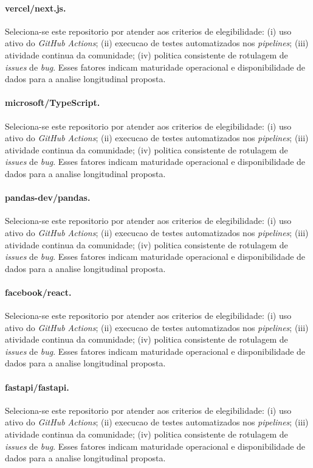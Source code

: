 \paragraph{vercel/next.js.} Seleciona-se este repositorio por atender aos criterios de elegibilidade: (i) uso ativo do \textit{GitHub Actions}; (ii) execucao de testes automatizados nos \textit{pipelines}; (iii) atividade continua da comunidade; (iv) politica consistente de rotulagem de \textit{issues} de \textit{bug}. Esses fatores indicam maturidade operacional e disponibilidade de dados para a analise longitudinal proposta.
\paragraph{microsoft/TypeScript.} Seleciona-se este repositorio por atender aos criterios de elegibilidade: (i) uso ativo do \textit{GitHub Actions}; (ii) execucao de testes automatizados nos \textit{pipelines}; (iii) atividade continua da comunidade; (iv) politica consistente de rotulagem de \textit{issues} de \textit{bug}. Esses fatores indicam maturidade operacional e disponibilidade de dados para a analise longitudinal proposta.
\paragraph{pandas-dev/pandas.} Seleciona-se este repositorio por atender aos criterios de elegibilidade: (i) uso ativo do \textit{GitHub Actions}; (ii) execucao de testes automatizados nos \textit{pipelines}; (iii) atividade continua da comunidade; (iv) politica consistente de rotulagem de \textit{issues} de \textit{bug}. Esses fatores indicam maturidade operacional e disponibilidade de dados para a analise longitudinal proposta.
\paragraph{facebook/react.} Seleciona-se este repositorio por atender aos criterios de elegibilidade: (i) uso ativo do \textit{GitHub Actions}; (ii) execucao de testes automatizados nos \textit{pipelines}; (iii) atividade continua da comunidade; (iv) politica consistente de rotulagem de \textit{issues} de \textit{bug}. Esses fatores indicam maturidade operacional e disponibilidade de dados para a analise longitudinal proposta.
\paragraph{fastapi/fastapi.} Seleciona-se este repositorio por atender aos criterios de elegibilidade: (i) uso ativo do \textit{GitHub Actions}; (ii) execucao de testes automatizados nos \textit{pipelines}; (iii) atividade continua da comunidade; (iv) politica consistente de rotulagem de \textit{issues} de \textit{bug}. Esses fatores indicam maturidade operacional e disponibilidade de dados para a analise longitudinal proposta.
